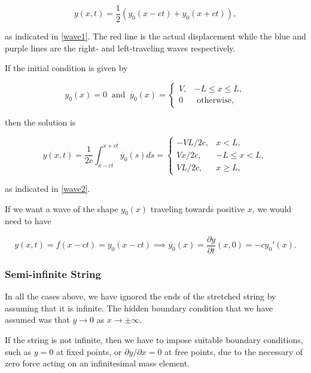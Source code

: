 \documentclass[a4paper,12pt]{report}
\begin{document}
\begin{equation}
	y(x,t) = \frac{1}{2}(y_0 (x-ct)+y_0 (x+ct)), 
\end{equation}

as indicated in \cref{wave1}. The red line is the actual displacement while the blue and purple lines are the right- and left-traveling waves respectively.


If the initial condition is given by 

\begin{equation}
	y_0 (x) = 0 ~\text { and }~ 
	\dot{y_0 }(x) = \begin{cases}
		V,& -L \le x \le L,\\
		0 &\text{ otherwise} ,
	\end{cases}
\end{equation}

then the solution is 

\begin{equation}
	y(x,t) = \frac{1}{2c} \int_{x-ct}^{x+ct} \dot{y_0 }(s)ds = \begin{cases}
		 -VL/2c ,& x<L,\\
		 Vx/2c ,& -L \le x <L,\\
		 VL/2c,& x \ge L,
	\end{cases} 
\end{equation}

as indicated in \cref{wave2}. 


If we want a wave of the shape \(y_0 (x)\) traveling towards positive \(x\), we would need to have 

\begin{equation}
	y(x,t) = f(x-ct) = y_0 (x-ct) \implies \dot{y_0 }(x) = \frac{\partial y}{\partial t}(x,0)  = -cy_0 '(x).  
\end{equation}

\subsubsection{Semi-infinite String}

In all the cases above, we have ignored the ends of the stretched string by assuming that it is infinite. The hidden boundary condition that we have assumed was that \(y \to 0\) as \(x \to \pm \infty\).

If the string is not infinite, then we have to impose suitable boundary conditions, such as \(y=0\) at fixed points, or \( \partial y/\partial x = 0\) at free points, due to the necessary of zero force acting on an infinitesimal mass element.  
\end{document}
